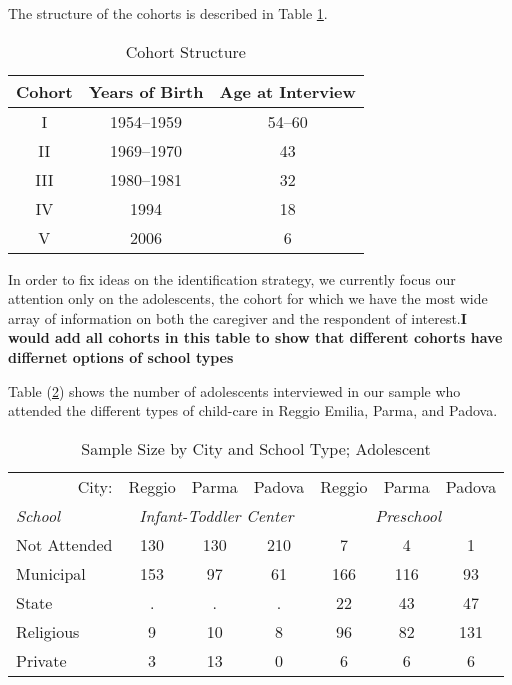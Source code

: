 \documentclass[12pt]{article}
\begin{document}
The structure of the cohorts is described in Table \ref{tab:cohorts}.

\begin{table}[tbph]
\caption{Cohort Structure}
\label{tab:cohorts}
\begin{center}
\begin{tabular}{ccc}
\hline\hline
Cohort & Years of Birth & Age at Interview \\ \hline
I & 1954--1959 & 54--60 \\ 
II & 1969--1970 & 43 \\ 
III & 1980--1981 & 32 \\ 
IV & 1994 & 18 \\ 
V & 2006 & 6 \\ \hline
\end{tabular}%
\end{center}
\end{table}

In order to fix ideas on the identification strategy, we currently focus our
attention only on the adolescents, the cohort for which we have the most
wide array of information on both the caregiver and the respondent of
interest.\textbf{I would add all cohorts in this table to show that
different cohorts have differnet options of school types}

Table (\ref{tab:sample-adol}) shows the number of adolescents interviewed in
our sample who attended the different types of child-care in Reggio Emilia,
Parma, and Padova.

\begin{table}[tbph]
\caption{Sample Size by City and School Type; Adolescent }
\label{tab:sample-adol}
\begin{center}
\begin{tabular}{l|ccc|ccc}
\hline\hline
\multicolumn{1}{r|}{City:} & Reggio & Parma & Padova & Reggio & Parma & 
Padova \\ 
\textit{School} & \multicolumn{3}{c|}{\textit{Infant-Toddler Center}} & 
\multicolumn{3}{c}{\textit{Preschool}} \\ \hline
Not Attended & 130 & 130 & 210 & 7 & 4 & 1 \\ 
Municipal & 153 & 97 & 61 & 166 & 116 & 93 \\ 
State & . & . & . & 22 & 43 & 47 \\ 
Religious & 9 & 10 & 8 & 96 & 82 & 131 \\ 
Private & 3 & 13 & 0 & 6 & 6 & 6 \\ \hline
\end{tabular}%
\end{center}
\end{table}
\end{document}

